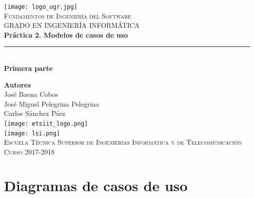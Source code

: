 \documentclass[12pt,spanish]{article}
\begin{document}
\begin{titlepage}

\newlength{\centeroffset}
\setlength{\centeroffset}{-0.5\oddsidemargin}
\addtolength{\centeroffset}{0.5\evensidemargin}
\thispagestyle{empty}

\noindent\hspace*{\centeroffset}\begin{minipage}{\textwidth}

\centering
\texttt{[image: logo\_ugr.jpg]}\\[1.4cm]

\textsc{ \Large Fundamentos de Ingeniería del Software\\[0.2cm]}
\textsc{GRADO EN INGENIERÍA INFORMÁTICA}\\[1cm]

{\Huge\bfseries Práctica 2. Modelos de casos de uso\\
}
\noindent\rule[-1ex]{\textwidth}{3pt}\\[3.5ex]
{\large\bfseries Primera parte}
\end{minipage}

\vspace{2.5cm}
\noindent\hspace*{\centeroffset}
\begin{minipage}{\textwidth}
\centering

\textbf{Autores}\\ {José Baena Cobos \\ José Miguel Pelegrina Pelegrina\\Carlos Sánchez Páez}\\[2.5ex]
\texttt{[image: etsiit\_logo.png]}\\[0.1cm]
\vspace{1.5cm}
\texttt{[image: lsi.png]}\\[0.1cm]
\vspace{1cm}
\textsc{Escuela Técnica Superior de Ingenierías Informática y de Telecomunicación}\\
\vspace{1cm}
\textsc{Curso 2017-2018}
\end{minipage}
\end{titlepage}
\tableofcontents
\thispagestyle{empty}
\listoffigures
\listoftables
\newpage
\setcounter{page}{1}

\section{Diagramas de casos de uso}
\end{document}

